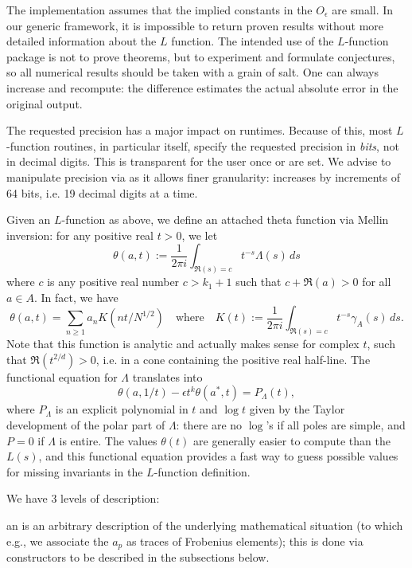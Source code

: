 The implementation assumes that the implied constants in the $O_\epsilon$ are
small. In our generic framework, it is impossible to return proven results
without more detailed information about the $L$ function. The intended use of
the $L$-function package is not to prove theorems, but to experiment and
formulate conjectures, so all numerical results should be taken with a grain
of salt. One can always increase  and recompute: the
difference estimates the actual absolute error in the original output.

 The requested precision has a major impact on runtimes.
Because of this, most $L$-function routines, in particular  itself,
specify the requested precision in \emph{bits}, not in decimal digits.
This is transparent for the user once  or
 are set. We advise to manipulate precision via
 as it allows finer granularity: 
increases by increments of 64 bits, i.e. 19 decimal digits at a time.


Given an $L$-function as above, we define an attached theta function
via Mellin inversion: for any positive real $t > 0$, we let
$$ \theta(a,t) := \dfrac{1}{2\pi i}\int_{\Re(s) = c} t^{-s} \Lambda(s)\, ds $$
where $c$ is any positive real number $c > k_1+1$ such that $c + \Re(a) > 0$
for all $a\in A$. In fact, we have
$$\theta(a,t) = \sum_{n\geq 1} a_n K(nt/N^{1/2})
\quad\text{where}\quad
K(t) := \dfrac{1}{2\pi i}\int_{\Re(s) = c} t^{-s} \gamma_A(s)\, ds.$$
Note that this function is analytic and actually makes sense for complex $t$,
such that $\Re(t^{2/d}) > 0$, i.e. in a cone containing the positive real
half-line. The functional equation for $\Lambda$ translates into
$$ \theta(a,1/t) - \epsilon t^k\theta(a^*,t) = P_\Lambda(t), $$
where $P_\Lambda$ is an explicit polynomial in $t$ and $\log t$ given by the
Taylor development of the polar part of $\Lambda$: there are no $\log$'s if
all poles are simple, and $P = 0$ if $\Lambda$ is entire. The values
$\theta(t)$ are generally easier to compute than the $L(s)$, and this
functional equation provides a fast way to guess possible values for
missing invariants in the $L$-function definition.


We have 3 levels of description:

\item an  is an arbitrary description of the underlying
mathematical situation (to which e.g., we associate the $a_p$ as traces of
Frobenius elements); this is done via constructors to be described in the
subsections below.

